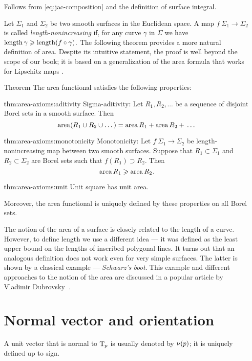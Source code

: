 Follows from \ref{eq:jac-composition} and the definition of surface integral.
\qeds

Let $\Sigma_1$ and $\Sigma_2$ be two smooth surfaces in the Euclidean space.
A map $f\:\Sigma_1\to \Sigma_2$ is called \emph{length-nonincreasing} if, for any curve $\gamma$ in $\Sigma$ we have $\mathop{\rm length}\nolimits\gamma\geqslant \mathop{\rm length}\nolimits (f\circ\gamma)$. 
The following theorem provides a more natural definition of area.
Despite its intuitive statement, the proof is well beyond the scope of our book;
it is based on a generalization of the area formula that works for Lipschitz maps \cite[3.2.3]{federer}.

\begin{thm}{Theorem}\label{thm:area-axioms}
The area functional satisfies the following properties:

\begin{subthm}{thm:area-axioms:aditivity}
Sigma-aditivity: 
Let $R_1,R_2,\dots$ be a sequence of disjoint Borel sets in a smooth surface.
Then 
\[\mathop{\rm area}\nolimits (R_1\cup R_2\cup \dots)=\mathop{\rm area}\nolimits R_1+\mathop{\rm area}\nolimits R_2+{}\dots\]
\end{subthm}

\begin{subthm}{thm:area-axioms:monotonicity}
Monotonicity:
Let $f\:\Sigma_1\to \Sigma_2$ be length-nonincreasing map between two smooth surfaces.
Suppose that $R_1\subset \Sigma_1$ and $R_2\subset \Sigma_2$ are Borel sets such that $f(R_1)\supset R_2$.
Then 
\[\mathop{\rm area}\nolimits R_1\geqslant \mathop{\rm area}\nolimits R_2.\]
\end{subthm}

\begin{subthm}{thm:area-axioms:unit}
Unit square has unit area. 
\end{subthm}

Moreover, the area functional is uniquely defined by these properties on all Borel sets.
\end{thm}

The notion of the area of a surface is closely related to the length of a curve.
However, to define length we use a different idea --- it was defined as the least upper bound on the lengths of inscribed polygonal lines.
It turns out that an analogous definition does not work even for very simple surfaces.
The latter is shown by a classical example --- \textit{Schwarz's boot}.
This example and different approaches to the notion of the area are discussed in a popular article by Vladimir Dubrovsky~\cite{dubrovsky}.

\section{Normal vector and orientation}
A unit vector that is normal to $\mathrm{T}_p$ is usually denoted by $\nu(p)$;
it is uniquely defined up to sign.

